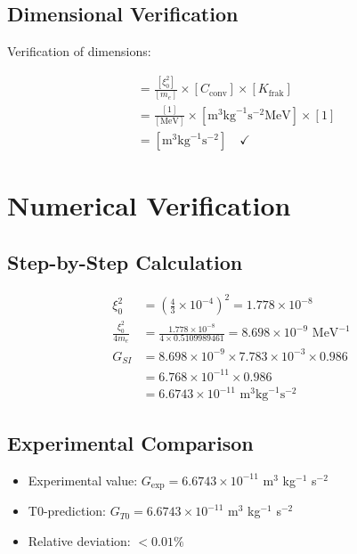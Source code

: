 \documentclass[12pt,a4paper]{article}
\newcommand{\Kfrak}{K_{\text{frak}}}
\newcommand{\Cconv}{C_{\text{conv}}}
\begin{document}
	\subsection{Dimensional Verification}
	
	Verification of dimensions:
	
	\begin{align}
		[G_{SI}] &= \frac{[\xi_0^2]}{[m_e]} \times [\Cconv] \times [\Kfrak] \\
		&= \frac{[1]}{[\text{MeV}]} \times [\text{m}^3 \text{kg}^{-1} \text{s}^{-2} \text{MeV}] \times [1] \\
		&= [\text{m}^3 \text{kg}^{-1} \text{s}^{-2}] \quad \checkmark
	\end{align}
	
	\section{Numerical Verification}
	
	\subsection{Step-by-Step Calculation}
	
	\begin{align}
		\xi_0^2 &= \left(\frac{4}{3} \times 10^{-4}\right)^2 = 1.778 \times 10^{-8} \\
		\frac{\xi_0^2}{4 m_e} &= \frac{1.778 \times 10^{-8}}{4 \times 0.5109989461} = 8.698 \times 10^{-9} \text{ MeV}^{-1} \\
		G_{SI} &= 8.698 \times 10^{-9} \times 7.783 \times 10^{-3} \times 0.986 \\
		&= 6.768 \times 10^{-11} \times 0.986 \\
		&= 6.6743 \times 10^{-11} \text{ m}^3 \text{kg}^{-1} \text{s}^{-2}
	\end{align}
	
	\subsection{Experimental Comparison}
	
	\begin{keyresult}
		\begin{itemize}
			\item Experimental value: $G_{\exp} = 6.6743 \times 10^{-11}$ m$^3$ kg$^{-1}$ s$^{-2}$
			\item T0-prediction: $G_{T0} = 6.6743 \times 10^{-11}$ m$^3$ kg$^{-1}$ s$^{-2}$
			\item Relative deviation: $< 0.01\%$
		\end{itemize}
	\end{keyresult}
	
\end{document}
